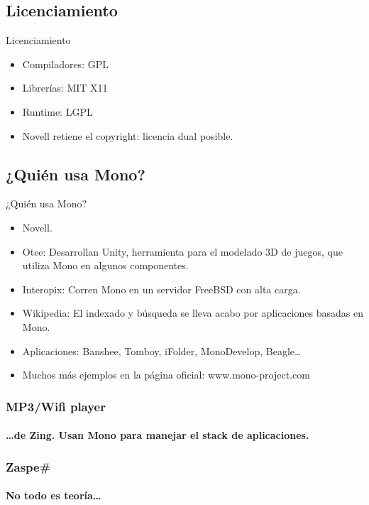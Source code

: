 \documentclass{beamer}
\begin{document}
\subsection{Licenciamiento}

\begin{frame}{Licenciamiento}
  \begin{itemize}
    \item Compiladores: GPL
    \item Librerías: MIT X11
    \item Runtime: LGPL
    \item Novell retiene el copyright: licencia dual posible.
  \end{itemize}
\end{frame}


\subsection{¿Quién usa Mono?}

\begin{frame}{¿Quién usa Mono?}
  \begin{itemize}
    \item Novell.
    \item Otee: Desarrollan Unity, herramienta para el modelado 3D de juegos, que
      utiliza Mono en algunos componentes.
    \item Interopix: Corren Mono en un servidor FreeBSD con alta carga.
    \item Wikipedia: El indexado y búsqueda se lleva acabo por aplicaciones basadas en Mono.
    \item Aplicaciones: Banshee, Tomboy, iFolder, MonoDevelop, Beagle\ldots
    \item Muchos más ejemplos en la página oficial: \alert{www.mono-project.com}
  \end{itemize}
\end{frame}

\begin{frame}[plain]
  \frametitle{MP3/Wifi player}
  \framesubtitle{\ldots de Zing. Usan Mono para manejar el stack de aplicaciones.}

  \begin{centering}
  \end{centering}
\end{frame}

\begin{frame}
  \frametitle{Zaspe\#}
  \framesubtitle{No todo es teoría\ldots}

  \begin{centering}
  \end{centering}
\end{frame}
\end{document}
